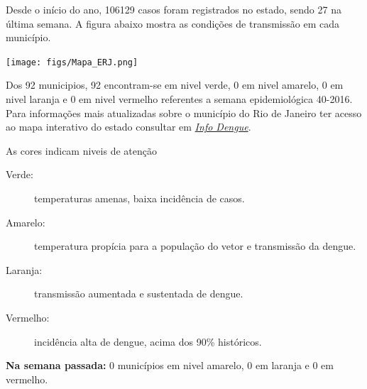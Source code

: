 \documentclass[10pt]{article} %
\begin{document}
\begin{minipage}[t]{.66\linewidth} %

\hypertarget{estado}{} %

Desde o início do ano, 106129 casos foram registrados no estado, sendo 27 na última semana. A figura abaixo mostra as condições de transmissão em cada município.

\texttt{[image: figs/Mapa\_ERJ.png]}

Dos 92 municipios, 92 encontram-se em nivel verde, 0 em nivel amarelo, 0 em nivel laranja e 0 em nivel vermelho referentes a semana epidemiológica 40-2016. Para informações mais atualizadas
sobre o município do Rio de Janeiro ter acesso ao mapa interativo do estado consultar em \href{http://info.dengue.mat.br}{\textit{Info Dengue}}.


\vspace{1cm}
\begin{mdframed}[style=intextbox,frametitle={}] %

\hypertarget{descriptivebox}{} %
As cores indicam niveis de atenção
\begin{description}
\item[Verde:] temperaturas amenas, baixa incidência de casos.      
\item[Amarelo:] temperatura propícia para a população do vetor e transmissão da dengue.
\item[Laranja:] transmissão aumentada e sustentada de dengue. 
\item[Vermelho:] incidência alta de dengue, acima dos 90\% históricos.
\end{description}
\end{mdframed}

 \textbf{Na semana passada:} 0 municípios em nivel amarelo, 0 em laranja e 0 em vermelho.    

\end{minipage} %
\end{document}
